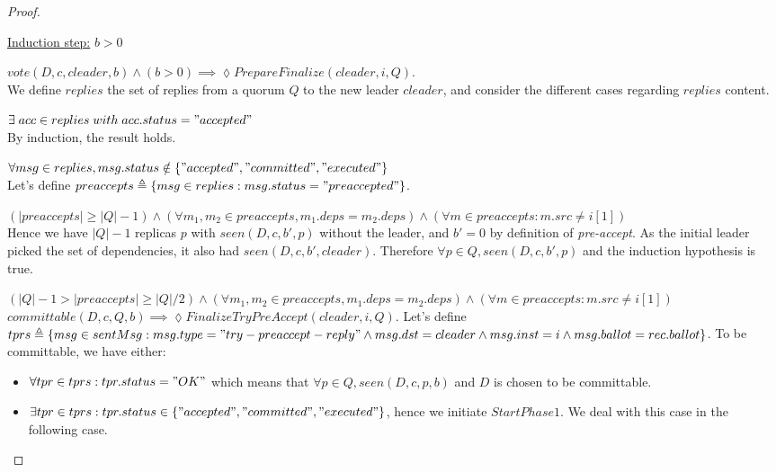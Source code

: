 \documentclass[a4paper]{article}
\theoremstyle{definition}
\theoremstyle{plain}
\begin{document}
\begin{proof}
\begin{case}
    \begin{flushleft}
    \underline{Induction step:} $b > 0$
    \end{flushleft}
    $vote(D,c,cleader,b) \wedge (b > 0) \implies \lozenge PrepareFinalize(cleader, i, Q)$.\\
    
    We define $replies$ the set of replies from a quorum $Q$ to the new leader $cleader$, and consider the different cases regarding $replies$ content.
    
    \begin{case}
        \item $\exists \; acc \in replies \; with \; acc.status = "accepted" $ \\
        By induction, the result holds.
        \item $\forall msg \in replies, msg.status \notin \{"accepted", "committed", "executed"\}$ \\
        Let's define $preaccepts \triangleq \{msg \in replies : msg.status = "preaccepted" \}$.
        
        \begin{case}
            \item $(|preaccepts| \geq |Q|-1)  \wedge (\forall m_1,m_2 \in preaccepts, m_1.deps = m_2.deps) \wedge (\forall m \in preaccepts : m.src \neq i[1])$\\
            Hence we have $|Q|-1$ replicas $p$ with $seen(D,c,b',p)$ without the leader, and $b'=0$ by definition of \textit{pre-accept}. As the initial leader picked the set of dependencies, it also had $seen(D,c,b',cleader)$. Therefore $\forall p \in Q, seen(D,c,b',p)$ and the induction hypothesis is true.
            \item $(|Q|-1 > |preaccepts| \geq |Q|/2  )  \wedge (\forall m_1,m_2 \in preaccepts, m_1.deps = m_2.deps) \wedge (\forall m \in preaccepts : m.src \neq i[1])$ \\
             $committable(D,c,Q,b) \implies \lozenge FinalizeTryPreAccept(cleader,i,Q)$. Let's define $tprs \triangleq \{msg \in sentMsg : msg.type = "try-preaccept-reply" \wedge msg.dst = cleader \wedge msg.inst = i \wedge msg.ballot = rec.ballot\}$. To be committable, we have either: 
            \begin{itemize}
                \item $\forall tpr \in tprs : tpr.status = "OK"$ which means that $\forall p \in Q, seen(D,c,p,b)$ and $D$ is chosen to be committable.
                \item $\exists tpr \in tprs : tpr.status \in \{"accepted", "committed", "executed"\}$, hence we initiate $StartPhase1$. We deal with this case in the following case.
            \end{itemize}


\end{case}
\end{case}
\end{case}
\end{proof}
\end{document}
